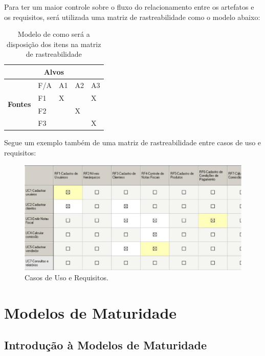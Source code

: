 Para ter um maior controle sobre o fluxo do relacionamento entre os artefatos e os requisitos, será utilizada uma matriz de rastreabilidade como o modelo abaixo:

\begin{table}[h]
\centering
\label{itens-traceability}
\begin{tabular}{|l|l|l|l|l|}
\hline
\multicolumn{5}{|c|}{\textbf{Alvos}}                  \\ \hline
\multirow{4}{*}{\textbf{Fontes}} & F/A & A1 & A2 & A3 \\ \cline{2-5} 
                                 & F1  & X  &    & X  \\ \cline{2-5} 
                                 & F2  &    & X  &    \\ \cline{2-5} 
                                 & F3  &    &    & X  \\ \hline
\end{tabular}
\caption{Modelo de como será a disposição dos itens na matriz de rastreabilidade}
\end{table}

Segue um exemplo também de uma matriz de rastreabilidade entre casos de uso e requisitos:

\begin{figure}[htb]
\centering
  \includegraphics[keepaspectratio=true,scale=0.5]
  {figuras/casos_de_uso.eps}
  \caption{Casos de Uso e Requisitos.~\cite{dev1}}
  \label{uc-requirements}
\end{figure}

\section{Modelos de Maturidade}

\subsection{Introdução à Modelos de Maturidade}

